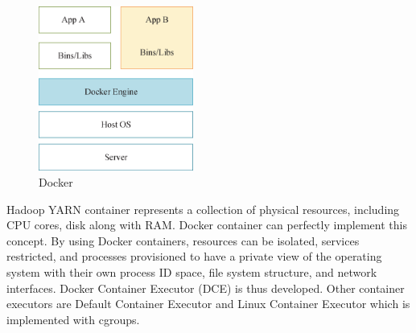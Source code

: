 \begin{figure}[t]
  \centering
  \includegraphics[width=2in]{figs/docker.eps}
  \caption{Docker}
  \label{fig:overview}
\end{figure}

Hadoop YARN container represents a collection of physical resources, including CPU cores, disk along with RAM. Docker container can perfectly implement this concept. By using Docker containers, resources can be isolated, services restricted, and processes provisioned to have a private view of the operating system with their own process ID space, file system structure, and network interfaces. Docker Container Executor (DCE) is thus developed. Other container executors are Default Container Executor and Linux Container Executor which is implemented with cgroups.

